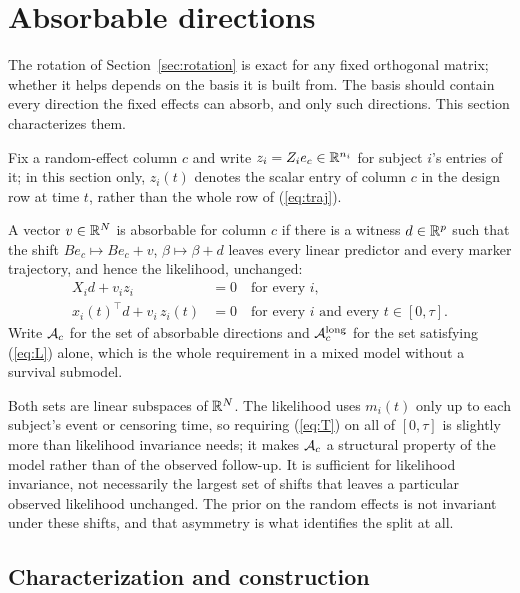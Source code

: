 \section{Absorbable directions}\label{sec:absorbable}

The rotation of Section~\ref{sec:rotation} is exact for any fixed
orthogonal matrix; whether it helps depends on the basis it is built from.
The basis should contain every direction the fixed effects can absorb,
and only such directions. This section characterizes them.

Fix a random-effect column $c$ and write $z_i = Z_i e_c \in \mathbb{R}^{n_i}$ for
subject $i$'s entries of it; in this section only, $z_i(t)$ denotes the
scalar entry of column $c$ in the design row at time $t$, rather than the
whole row of (\ref{eq:traj}).

\begin{definition}\label{def:abs}
A vector $v \in \mathbb{R}^N$ is absorbable for column $c$ if there is a witness
$d \in \mathbb{R}^p$ such that the shift $B e_c \mapsto B e_c + v$, $\beta \mapsto
\beta + d$ leaves every linear predictor and every marker trajectory, and
hence the likelihood, unchanged:
\begin{align}
X_i d + v_i z_i &= 0 \quad \text{for every } i, \tag{L}\label{eq:L}\\
x_i(t)^{\top} d + v_i\, z_i(t) &= 0 \quad \text{for every } i
\text{ and every } t \in [0, \tau]. \tag{T}\label{eq:T}
\end{align}
Write $\mathcal{A}_c$ for the set of absorbable directions and $\mathcal{A}_c^{\mathrm{long}}$
for the set satisfying (\ref{eq:L}) alone, which is the whole requirement
in a mixed model without a survival submodel.
\end{definition}

Both sets are linear subspaces of $\mathbb{R}^N$. The likelihood uses $m_i(t)$
only up to each subject's event or censoring time, so requiring
(\ref{eq:T}) on all of $[0, \tau]$ is slightly more than likelihood
invariance needs; it makes $\mathcal{A}_c$ a structural property of the model
rather than of the observed follow-up. It is sufficient for likelihood
invariance, not necessarily the largest set of shifts that leaves a
particular observed likelihood unchanged. The prior on the random effects is
not invariant under these shifts, and that asymmetry is what identifies
the split at all.

\subsection{Characterization and construction}

